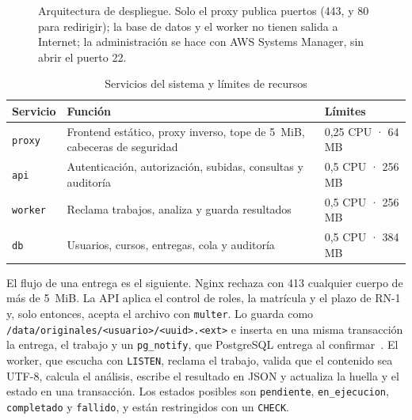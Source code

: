 \documentclass[conference,a4paper]{IEEEtran}
\newcommand{\cod}[1]{\texttt{#1}}
\begin{document}
\begin{figure}[!t]
{}
\caption{Arquitectura de despliegue. Solo el proxy publica puertos (443, y 80 para redirigir); la base de datos y el worker no tienen salida a Internet; la administración se hace con AWS Systems Manager, sin abrir el puerto 22.}
\label{fig:arq}
\end{figure}

\begin{table}[!t]
\caption{Servicios del sistema y límites de recursos}\label{tab:servicios}
\centering\footnotesize
\begin{tabular}{@{}l >{\raggedright\arraybackslash}p{3.3cm} l@{}}
\toprule
Servicio & Función & Límites\\
\midrule
\cod{proxy} & Frontend estático, proxy inverso, tope de 5~MiB, cabeceras de seguridad & 0,25 CPU · 64 MB\\
\cod{api} & Autenticación, autorización, subidas, consultas y auditoría & 0,5 CPU · 256 MB\\
\cod{worker} & Reclama trabajos, analiza y guarda resultados & 0,5 CPU · 256 MB\\
\cod{db} & Usuarios, cursos, entregas, cola y auditoría & 0,5 CPU · 384 MB\\
\bottomrule
\end{tabular}
\end{table}

El flujo de una entrega es el siguiente. Nginx rechaza con 413 cualquier cuerpo de más de 5~MiB. La API aplica el control de roles, la matrícula y el plazo de RN-1 y, solo entonces, acepta el archivo con \cod{multer}. Lo guarda como \cod{/data/originales/<usuario>/<uuid>.<ext>} e inserta en una misma transacción la entrega, el trabajo y un \cod{pg\_notify}, que PostgreSQL entrega al confirmar~\cite{pg-notify}. El worker, que escucha con \cod{LISTEN}, reclama el trabajo, valida que el contenido sea UTF-8, calcula el análisis, escribe el resultado en JSON y actualiza la huella y el estado en una transacción. Los estados posibles son \cod{pendiente}, \cod{en\_ejecucion}, \cod{completado} y \cod{fallido}, y están restringidos con un \cod{CHECK}.
\end{document}
